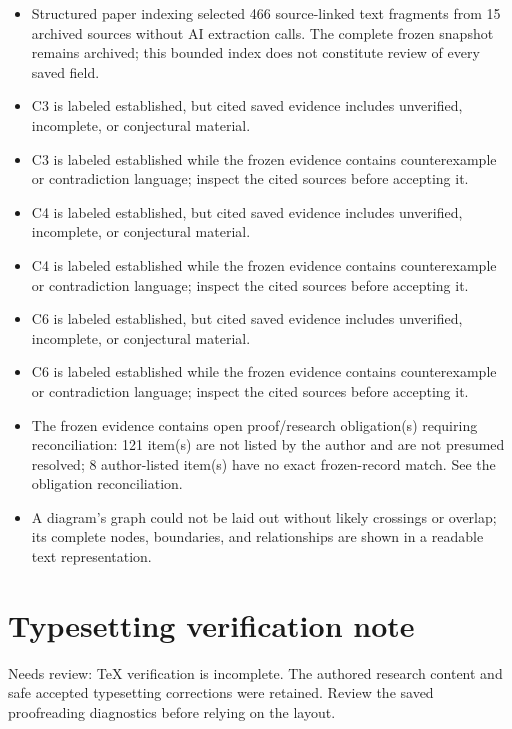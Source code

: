 \documentclass[11pt]{article}
\begin{document}
\begin{itemize}
\item Structured paper indexing selected 466 source-linked text fragments from 15 archived sources without AI extraction calls. The complete frozen snapshot remains archived; this bounded index does not constitute review of every saved field.
\item C3 is labeled established, but cited saved evidence includes unverified, incomplete, or conjectural material.
\item C3 is labeled established while the frozen evidence contains counterexample or contradiction language; inspect the cited sources before accepting it.
\item C4 is labeled established, but cited saved evidence includes unverified, incomplete, or conjectural material.
\item C4 is labeled established while the frozen evidence contains counterexample or contradiction language; inspect the cited sources before accepting it.
\item C6 is labeled established, but cited saved evidence includes unverified, incomplete, or conjectural material.
\item C6 is labeled established while the frozen evidence contains counterexample or contradiction language; inspect the cited sources before accepting it.
\item The frozen evidence contains open proof/research obligation(s) requiring reconciliation: 121 item(s) are not listed by the author and are not presumed resolved; 8 author-listed item(s) have no exact frozen-record match. See the obligation reconciliation.
\item A diagram's graph could not be laid out without likely crossings or overlap; its complete nodes, boundaries, and relationships are shown in a readable text representation.
\end{itemize}
\section*{Typesetting verification note}
Needs review: TeX verification is incomplete. The authored research content and safe accepted typesetting corrections were retained. Review the saved proofreading diagnostics before relying on the layout.
\end{document}
